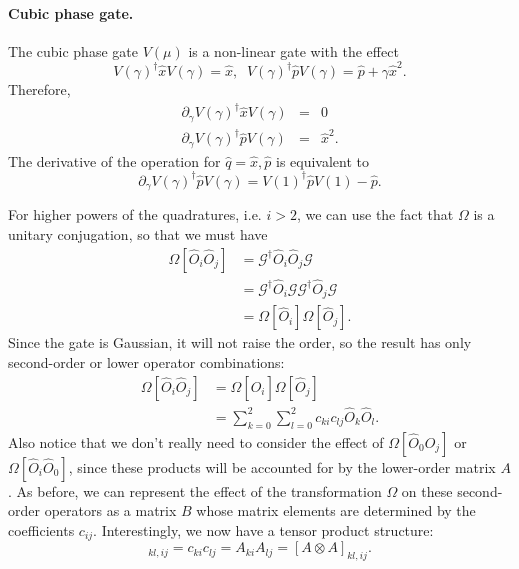 \documentclass[aps,pra,10pt,twocolumn,groupedaddress,nofootinbib]{revtex4-1}
\theoremstyle{plain}
\newcommand{\x}{\hat{x}}
\newcommand{\p}{\hat{p}}
\begin{document}
\paragraph{Cubic phase gate.}
The cubic phase gate $V(\mu)$ is a non-linear gate with the effect
\[V(\gamma)^{\dagger} \x V(\gamma) = \x, \;\; V(\gamma)^{\dagger} \p V(\gamma) = \p + \gamma \x^2. \]
Therefore, 
\begin{eqnarray}
\partial_{\gamma} V(\gamma)^{\dagger} \x V(\gamma) &=& 0\\
\partial_{\gamma} V(\gamma)^{\dagger} \p V(\gamma) &=& \x^2.
\end{eqnarray} 
The derivative of the operation for $\hat{q} = \x, \p$ is equivalent to 
\[ \partial_{\gamma} V(\gamma)^{\dagger} \hat{p} V(\gamma) =   V\left(1 \right)^{\dagger} \hat{p} V \left(1 \right) -  \hat{p}.
\]








For higher powers of the quadratures, i.e. $i > 2$, we can use the fact that $\Omega$ is a unitary conjugation, so that we must have
\begin{align}
 \Omega[\hat{O}_i\hat{O}_j] 
 & = \mathcal{G}^\dagger \hat{O}_i \hat{O}_j \mathcal{G} \nonumber \\
 & = \mathcal{G}^\dagger \hat{O}_i \mathcal{G} \mathcal{G}^\dagger\hat{O}_j \mathcal{G} \nonumber\\
 & = \Omega[\hat{O}_i] \Omega[\hat{O}_j].
\end{align}
Since the gate is Gaussian, it will not raise the order, so the result has only second-order or lower operator combinations:
\begin{align}
 \Omega[\hat{O}_i\hat{O}_j] 
 & = \Omega[\hat{O}_i] \Omega[\hat{O}_j] \nonumber \\
 & = \sum_{k=0}^2 \sum_{l=0}^2 c_{ki}c_{lj} \hat{O}_k \hat{O}_l.
\end{align}
Also notice that we don't really need to consider the effect of $\Omega[\hat{O}_0\hat{O}_j]$ or $\Omega[\hat{O}_i\hat{O}_0]$, since these products will be accounted for by the lower-order matrix $A$.
As before, we can represent the effect of the transformation $\Omega$ on these second-order operators as a matrix $B$ whose matrix elements are determined by the coefficients $c_{ij}$. Interestingly, we now have a tensor product structure:
\begin{equation}
 [B]_{kl,ij} = c_{ki} c_{lj} = A_{ki}A_{lj} = [A\otimes A]_{kl,ij}.
\end{equation}
\end{document}

